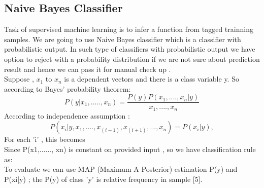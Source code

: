\subsection{Naive Bayes Classifier}
Task of supervised machine learning is to infer a function from tagged trainning samples.  We are going to use Naive Bayes classifier which is a classifier with probabilistic output. In such type of classifiers with probabilistic output we have option to reject with a probability distribution if we are not sure about prediction result and hence we can pass it for manual check up \cite{edtr4}.\\
Suppose , $x_1$ to $x_n$ is a dependent vectors and there is a class variable y. So according to Bayes' probability theorem:
\begin{equation}
  P(y|x_1,.....,x_n)=\frac{P(y)P(x_1,....,x_n|y)}{x_1,....,x_n}
\end{equation}
According to independence assumption :
\begin{equation}
  P(x_i|y, x_1,....,x_(i-1),x_(i+1),...,x_n)=P(x_i|y),
\end{equation}
For each 'i' , this becomes 
\begin{equation}
 
\end{equation}
 Since P(x1,......, xn)  is constant on provided input , so we have classification rule as:
 \begin{equation}
  
\end{equation}
To  evaluate we can use MAP (Maximum A Posterior) estimation P(y) and  P(xi|y) ; the P(y) of class 'y' is relative frequency in sample [5]. 